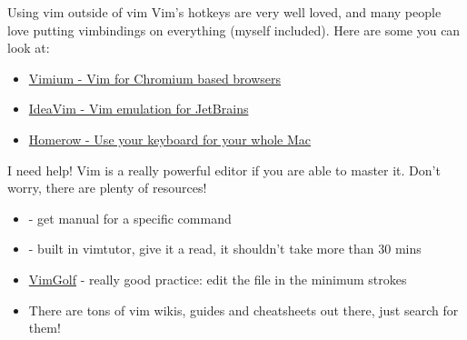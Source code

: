 \documentclass[12pt]{beamer}
\begin{document}
\begin{frame}{Using vim outside of vim}
    Vim's hotkeys are very well loved, and many people love putting vimbindings on everything (myself included).
    Here are some you can look at:

    \begin{itemize}
        \item \href{https://chrome.google.com/webstore/detail/vimium/dbepggeogbaibhgnhhndojpepiihcmeb?hl=en}{Vimium - Vim for Chromium based browsers}
        \item \href{https://plugins.jetbrains.com/plugin/164-ideavim}{IdeaVim - Vim emulation for JetBrains}
        \item \href{https://www.homerow.app}{Homerow - Use your keyboard for your whole Mac}
    \end{itemize}{}
\end{frame}{}

\begin{frame}{I need help!}
    Vim is a really powerful editor if you are able to master it. Don't worry, there are plenty of resources!
    \begin{itemize}
        \item {} - get manual for a specific command
        \item {} - built in vimtutor, give it a read, it shouldn't take more than 30 mins
        \item \href{https://www.vimgolf.com}{VimGolf} - really good practice: edit the file in the minimum strokes
        \item There are tons of vim wikis, guides and cheatsheets out there, just search for them!
    \end{itemize}{}
\end{frame}{}
\end{document}
